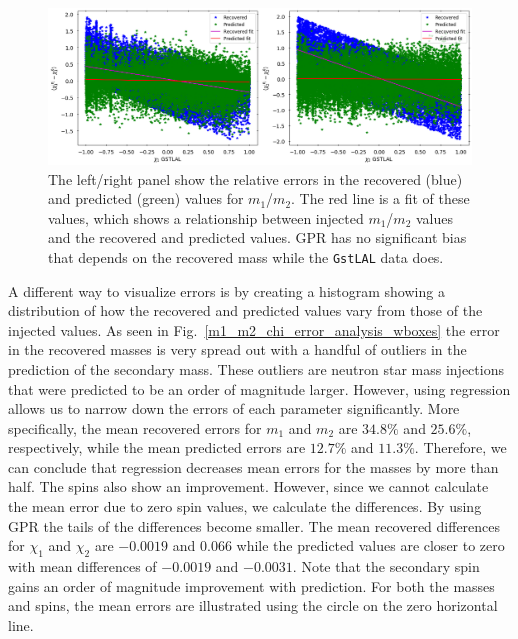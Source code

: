 \documentclass[aps,prd,twocolumn,superscriptaddress,preprintnumbers,floatfix,nofootinbib]{revtex4-2}
\begin{document}
\begin{figure}[!h]
	\centering
	\includegraphics[width=\linewidth]{m_chi1_chi2_errors_and_fits.png}
	\caption{%
	 		The left/right panel show the relative errors in the recovered (blue) and 
			predicted (green) values for $m_1$/$m_2$. The red line is a fit of these values, which 
			shows a relationship between injected $m_1$/$m_2$ values and the recovered and 
			predicted values. GPR has no significant bias that depends on the recovered mass 
			while the \texttt{GstLAL} data does.}
 	\label{m_chi1_chi2_errors_and_fits}
\end{figure}

A different way to visualize errors is by creating a histogram showing a
distribution of how the recovered and predicted values vary from those of the
injected values. As seen in Fig.~\ref{m1_m2_chi_error_analysis_wboxes} the 
error in the recovered masses is very spread out with a handful of outliers in
the prediction of the secondary mass. These outliers are neutron star mass
injections that were predicted to be an order of magnitude larger. However, 
using regression allows us to narrow down the errors of each parameter
significantly. More specifically, the mean recovered errors for $m_1$ and $m_2$ 
are $34.8\%$ and $25.6\%$, respectively, while the mean predicted errors are
$12.7\%$ and $11.3\%$. Therefore, we can conclude that regression decreases 
mean errors for the masses by more than half. The spins also show an
improvement. However, since we cannot calculate the mean error due to zero 
spin values, we calculate the differences. By using GPR the tails of the 
differences become smaller. The mean recovered differences for $\chi_1$ and 
$\chi_2$ are $-0.0019$ and $0.066$ while the predicted values are closer to 
zero with mean differences of $-0.0019$ and $-0.0031$. Note that the secondary
spin gains an order of magnitude improvement with prediction. For both the 
masses and spins, the mean errors are illustrated using the circle on the zero 
horizontal line.
\end{document}
